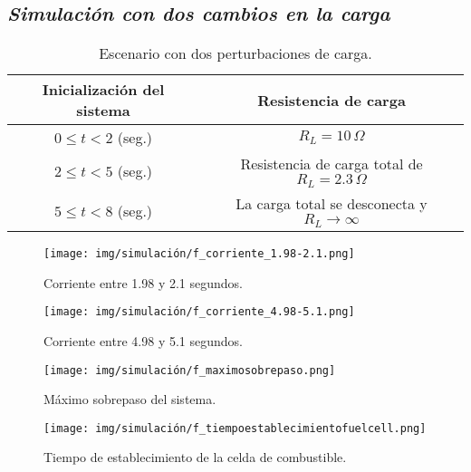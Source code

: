 \subsection{\textit{Simulación con dos cambios en la carga}}

\begin{table}[H]
    \centering
    \begin{tabular}{|c|c|}
    \hline
    \textbf{Inicialización del sistema} & \textbf{Resistencia de carga} \\
    \hline
    $0 \leq t < 2$ (seg.) & $R_L = 10\,\Omega$ \\
    \hline
    $2 \leq t < 5$ (seg.) & Resistencia de carga total de $R_L = 2.3\,\Omega$ \\
    \hline
    $5 \leq t < 8$ (seg.) & La carga total se desconecta y $R_L \rightarrow \infty$ \\
    \hline
\end{tabular}
\caption{Escenario con dos perturbaciones de carga.}
\label{tab:f}
\end{table}


\begin{figure}[H]
    \centering
    \texttt{[image: img/simulación/f\_corriente\_1.98-2.1.png]}
    \caption{Corriente entre 1.98 y 2.1 segundos.}
    \label{fig:f_corriente_1.98-2.1}
\end{figure}

\begin{figure}[H]
    \centering
    \texttt{[image: img/simulación/f\_corriente\_4.98-5.1.png]}
    \caption{Corriente entre 4.98 y 5.1 segundos.}
\label{fig:f_corriente_4.98-5.1}
\end{figure}

\begin{figure}[H]
    \centering
    \texttt{[image: img/simulación/f\_maximosobrepaso.png]}
    \caption{Máximo sobrepaso del sistema.}
\label{fig:f_maximosobrepaso}
\end{figure}

\begin{figure}[H]
    \centering
    \texttt{[image: img/simulación/f\_tiempoestablecimientofuelcell.png]}
    \caption{Tiempo de establecimiento de la celda de combustible.}
    \label{fig:f_tiempoestablecimientofuelcell}
\end{figure}

